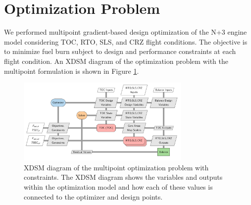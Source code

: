 \documentclass[conf]{new-aiaa}
\begin{document}
\section{Optimization Problem}
\label{sec:optprob}

We performed multipoint gradient-based design optimization of the N+3 engine model considering TOC, RTO, SLS, and CRZ flight conditions.
The objective is to minimize fuel burn subject to design and performance constraints at each flight condition.
An XDSM diagram of the optimization problem with the multipoint formulation is shown in Figure \ref{fig:N3_xdsm_opt}.

\begin{figure}[!hbt]
    \centering
    \includegraphics[width=0.75\textwidth]{N3_xdsm_opt.pdf}
    \caption{
        XDSM diagram of the multipoint optimization problem with constraints.
        The XDSM diagram shows the variables and outputs within the optimization model and how each of these values is connected to the optimizer and design points.}
    \label{fig:N3_xdsm_opt}
\end{figure}
\end{document}
